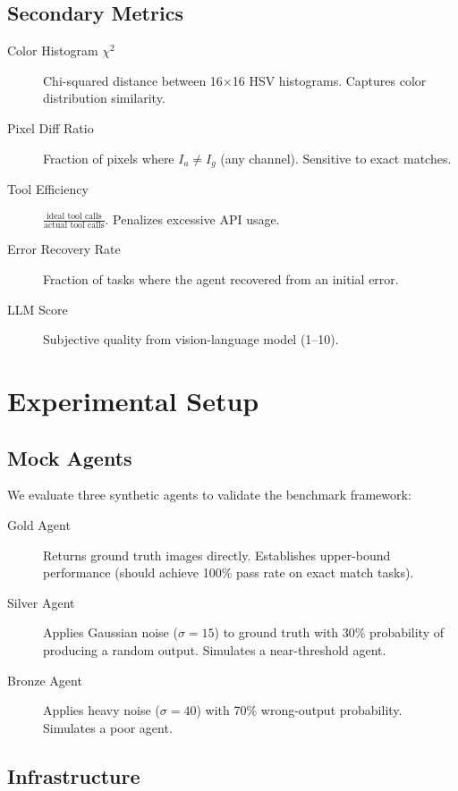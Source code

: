 \documentclass[11pt,a4paper]{article}
\begin{document}
\subsection{Secondary Metrics}

\begin{description}
    \item[Color Histogram $\chi^2$] Chi-squared distance between 16$\times$16 HSV histograms. Captures color distribution similarity.
    \item[Pixel Diff Ratio] Fraction of pixels where $I_a \neq I_g$ (any channel). Sensitive to exact matches.
    \item[Tool Efficiency] $\frac{\text{ideal tool calls}}{\text{actual tool calls}}$. Penalizes excessive API usage.
    \item[Error Recovery Rate] Fraction of tasks where the agent recovered from an initial error.
    \item[LLM Score] Subjective quality from vision-language model (1--10).
\end{description}

\section{Experimental Setup}

\subsection{Mock Agents}

We evaluate three synthetic agents to validate the benchmark framework:

\begin{description}
    \item[Gold Agent] Returns ground truth images directly. Establishes upper-bound performance (should achieve 100\% pass rate on exact match tasks).
    \item[Silver Agent] Applies Gaussian noise ($\sigma=15$) to ground truth with 30\% probability of producing a random output. Simulates a near-threshold agent.
    \item[Bronze Agent] Applies heavy noise ($\sigma=40$) with 70\% wrong-output probability. Simulates a poor agent.
\end{description}

\subsection{Infrastructure}
\end{document}
